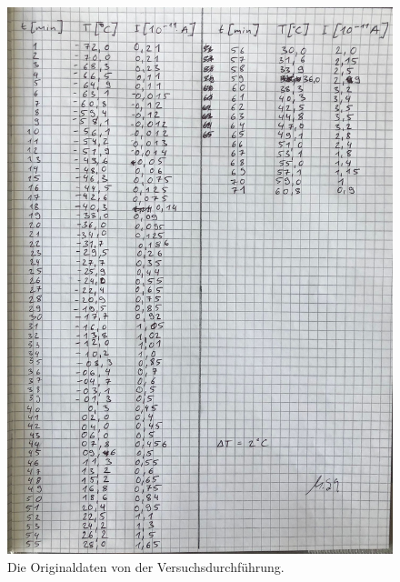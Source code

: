 \begin{figure}
    \includegraphics[width=\textwidth]{bilder/Anhang_2.jpeg}
    \caption{Die Originaldaten von der Versuchsdurchführung.}
    \label{fig:originaldaten}
\end{figure}